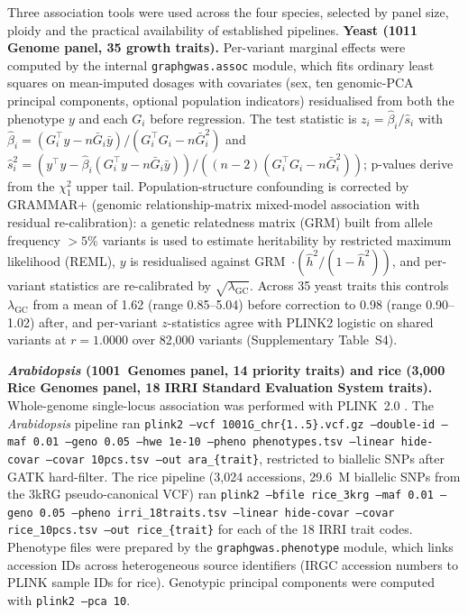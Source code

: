 Three association tools were used across the four species,
selected by panel size, ploidy and the practical availability of
established pipelines. \textbf{Yeast (1011 Genome panel, 35 growth
traits).} Per-variant marginal effects were computed by the
internal \texttt{graphgwas.assoc} module, which fits ordinary least
squares on mean-imputed dosages with covariates (sex, ten
genomic-PCA principal components, optional population indicators)
residualised from both the phenotype $y$ and each $G_i$ before
regression. The test statistic is $z_i = \hat\beta_i / \hat s_i$
with $\hat\beta_i = (G_i^\top y - n \bar G_i \bar y) / (G_i^\top G_i - n \bar G_i^2)$
and $\hat s_i^2 = (y^\top y - \hat\beta_i (G_i^\top y - n \bar G_i \bar y)) / ((n-2)(G_i^\top G_i - n\bar G_i^2))$;
p-values derive from the $\chi^2_1$ upper tail. Population-structure
confounding is corrected by GRAMMAR+ (genomic relationship-matrix
mixed-model association with residual
re-calibration)\cite{yang2011gcta}: a genetic relatedness matrix
(GRM) built from allele frequency $> 5\%$ variants is used to
estimate heritability by restricted maximum likelihood (REML), $y$
is residualised against
GRM~$\cdot (\hat h^2 / (1 - \hat h^2))$, and per-variant statistics
are re-calibrated by $\sqrt{\lambda_{\text{GC}}}$. Across 35 yeast
traits this controls $\lambda_{\text{GC}}$ from a mean of 1.62
(range 0.85--5.04) before correction to 0.98 (range 0.90--1.02)
after, and per-variant $z$-statistics agree with PLINK2 logistic on
shared variants at $r=1.0000$ over 82{,}000 variants
(Supplementary Table~S4).

\textbf{\emph{Arabidopsis} (1001~Genomes panel, 14 priority
traits) and rice (3{,}000 Rice Genomes panel, 18 IRRI Standard
Evaluation System traits).} Whole-genome single-locus association
was performed with PLINK~2.0 \cite{chang2015second}. The
\emph{Arabidopsis} pipeline ran
\texttt{plink2 --vcf 1001G\_chr\{1..5\}.vcf.gz --double-id
--maf 0.01 --geno 0.05 --hwe 1e-10 --pheno phenotypes.tsv
--linear hide-covar --covar 10pcs.tsv --out
ara\_\{trait\}}, restricted to biallelic SNPs after GATK
hard-filter. The rice pipeline (3{,}024 accessions, 29.6~M
biallelic SNPs from the 3kRG pseudo-canonical VCF) ran
\texttt{plink2 --bfile rice\_3krg --maf 0.01 --geno 0.05 --pheno
irri\_18traits.tsv --linear hide-covar --covar
rice\_10pcs.tsv --out rice\_\{trait\}} for each of the 18 IRRI
trait codes. Phenotype files were prepared by the
\texttt{graphgwas.phenotype} module, which links accession IDs
across heterogeneous source identifiers (IRGC accession numbers
to PLINK sample IDs for rice). Genotypic principal components
were computed with \texttt{plink2 --pca 10}.

